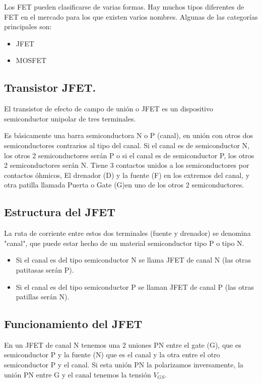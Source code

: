 \documentclass[12pt, a4paper]{article}
\begin{document}
    Los FET pueden clasificarse de varias formas. Hay muchos tipos diferentes de FET en el mercado para los que existen varios nombres. Algunas de las categorías principales son:

    \begin{itemize}
        \item JFET
        \item MOSFET
    \end{itemize}

    \subsection{Transistor JFET.}

    El transistor de efecto de campo de unión o JFET es un dispositivo semiconductor unipolar de tres terminales.

    Es básicamente una barra semiconductora N o P (canal), en unión con otros dos semiconductores contrarios al tipo del canal. Si el canal es de semiconductor N, los otros 2 semiconductores serán P o si el canal es de semiconductor P, los otros 2 semiconductores serán N. Tiene 3 contactos unidos a los semiconductores por contactos óhmicos, El drenador (D) y la fuente (F) en los extremos del canal, y otra patilla llamada Puerta o Gate (G)en uno de los otros 2 semiconductores.

    \subsection{Estructura del JFET}

    La ruta de corriente entre estos dos terminales (fuente y drenador) se denomina "canal", que puede estar hecho de un material semiconductor tipo P o tipo N.

    \begin{itemize}
        \item Si el canal es del tipo semiconductor N se llama JFET de canal N (las otras patitasas serán P).
        \item Si el canal es del tipo semiconductor P se llaman JFET de canal P (las otras patillas serán N).
    \end{itemize}

    \subsection{Funcionamiento del JFET}

    En un JFET de canal N tenemos una 2 uniones PN entre el gate (G), que es semiconductor P y la fuente (N) que es el canal y la otra entre el otro semiconductor P y el canal. Si esta unión PN la polarizamos inversamente, la unión PN entre G y el canal tenemos la tensión $V_{GS}$. 
    
\end{document}

